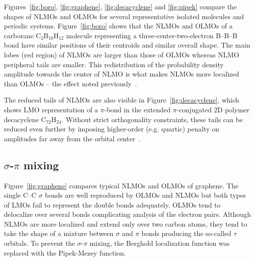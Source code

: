 \documentclass[aps,prl,reprint,amsmath,amssymb]{revtex4-1}
\begin{document}
Figures~\ref{fig:boro}, \ref{fig:graphene}, \ref{fig:decacyclene} and \ref{fig:pipek} compare the shapes of NLMOs and OLMOs for several representative isolated molecules and periodic systems. 
Figure~\ref{fig:boro} shows that the NLMOs and OLMOs of a carborane C$_2$B$_{10}$H$_{12}$ molecule representing a three-center-two-electron B--B--B bond have similar positions of their centroids and similar overall shape. 
The main lobes (red region) of NLMOs are larger than those of OLMOs whereas NLMO peripheral tails are smaller. This redistribution of the probability density amplitude towards the center of NLMO is what makes NLMOs more localized than OLMOs -- the effect noted previously~\cite{liu2000nonorthogonal}. 

The reduced tails of NLMOs are also visible in Figure~\ref{fig:decacyclene}, which shows LMO representation of a $\pi$-bond in the extended $\pi$-conjugated 2D polymer decacyclene C$_{72}$H$_{24}$. Without strict orthogonality constraints, these tails can be reduced even further by imposing higher-order (e.g. quartic) penalty on amplitudes far away from the orbital center~\cite{hoyvik2012orbital}.

\subsection{$\sigma$-$\pi$ mixing}

Figure~\ref{fig:graphene} compares typical NLMOs and OLMOs of graphene. 
The single C--C $\sigma$ bonds are well reproduced by OLMOs and NLMOs but both types of LMOs fail to represent the double bonds adequately.  OLMOs tend to delocalize over several bonds complicating analysis of the electron pairs. Although NLMOs are more localized and extend only over two carbon atoms, they tend to take the shape of a mixture between $\sigma$ and $\pi$ bonds producing the so-called $\tau$ orbitals. To prevent the $\sigma$-$\pi$ mixing, the Berghold localization function was replaced with the Pipek-Mezey function. 
\end{document}
